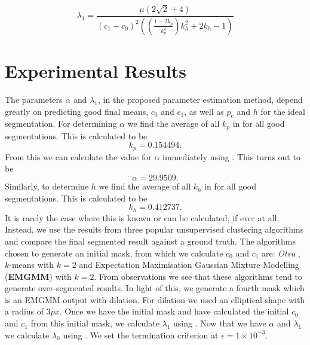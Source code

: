 \begin{equation}
	\lambda_1 = \frac{\mu \left( 2\sqrt{2}+4\right)}{(c_1-c_0)^2\left( \left( \frac{1-2k_p}{k_p^2} \right)k_h^2 +2k_h -1 \right)}
	\label{eq:lambda1fromkpandkh}
\end{equation}

\section{Experimental Results}
\label{sec:cvgc_experimentalresults}

The parameters $\alpha$ and $\lambda_1$, in the proposed parameter estimation method, depend greatly on predicting good final means, $c_0$ and $c_1$, as well as $p_e$ and $h$ for the ideal segmentation. For determining $\alpha$ we find the average of all $k_p$ in  for all good segmentations. This is calculated to be
\begin{equation*}
	k_p = 0.154494.
\end{equation*}
From this we can calculate the value for $\alpha$ immediately using . This turns out to be
\begin{equation}
\alpha = 29.9509.
\end{equation}
Similarly, to determine $h$ we find the average of all $k_h$ in  for all good segmentations. This is calculated to be
\begin{equation*}
	k_h = 0.412737.
\end{equation*}
It is rarely the case where this is known or can be calculated, if ever at all. Instead, we use the results from three popular unsupervised clustering algorithms and compare the final segmented result against a ground truth. The algorithms chosen to generate an initial mask, from which we calculate $c_0$ and $c_1$ are: \textit{Otsu} \citep{Otsu1979}, $k$-means \citep{Kanungo2002} with $k=2$ and Expectation Maximisation Gaussian Mixture Modelling (\textbf{EMGMM}) \citep{Figueiredo2002} with $k=2$. From observations we see that these algorithms tend to generate over-segmented results. In light of this, we generate a fourth mask which is an EMGMM output with dilation. For dilation we used an elliptical shape with a radius of $3px$. Once we have the initial mask and have calculated the initial $c_0$ and $c_1$ from this initial mask, we calculate $\lambda_1$ using . Now that we have $\alpha$ and $\lambda_1$ we calculate $\lambda_0$ using . We set the termination criterion at $\epsilon=1 \times 10^{-3}$.


